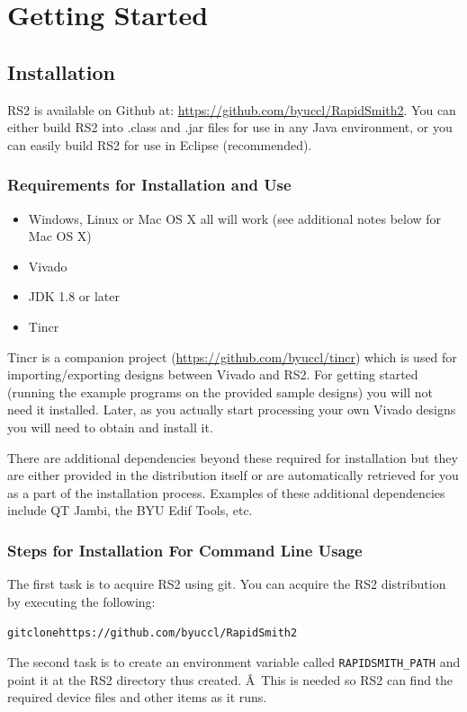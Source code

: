 \documentclass[12pt]{article}
\newcommand{\env}[1]{{\texttt{#1}}}
\newenvironment{code}{\begin{center} \begin{minipage}{6in} \noindent \begin{alltt}}{\end{alltt} \end{minipage} \end{center}}
\begin{document}
\section{Getting Started}

\subsection{Installation}

RS2 is available on Github at: \url{https://github.com/byuccl/RapidSmith2}.  
You can either build RS2 into .class and .jar files for use in any Java
environment, or you can easily build RS2 for use in Eclipse (recommended).

\subsubsection{Requirements for Installation and Use}
\begin{itemize}
  \item Windows, Linux or Mac OS X all will work (see additional notes below for
  Mac OS X)
  \item Vivado
  \item JDK 1.8 or later
  \item Tincr 
\end{itemize}

Tincr is a companion project (\url{https://github.com/byuccl/tincr}) which 
is used for importing/exporting designs between Vivado
and RS2.  For getting started (running the example programs on the
provided sample designs) you will not need it installed.
Later, as you  actually start processing your own Vivado designs you will need
to obtain and install it.  

There are additional dependencies beyond these required for installation but
they are either provided in the distribution itself or are
automatically retrieved for you as a part of the installation process. 
Examples of these additional dependencies include QT Jambi, the BYU Edif Tools,
etc.
 
\subsubsection{Steps for Installation For Command Line Usage}
The first task is to acquire RS2 using git.
You can acquire the RS2 distribution by executing the following: 
\vspace{-0.15in}  \begin{code}
git clone https://github.com/byuccl/RapidSmith2
\end{code} 
The second task is to create an environment variable called
\env{RAPIDSMITH\_PATH} and point it at the RS2 directory thus created. Â This is
needed so RS2 can find the required device files and other items as it runs.
\end{document}
